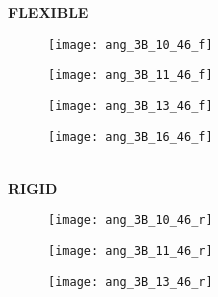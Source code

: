 \documentclass[12pt]{article}
\begin{document}
\begin{figure}[h!]
	\centering
	   \textbf{FLEXIBLE} \\
  \begin{subfigure}[b]{0.15\textwidth}
    \texttt{[image: ang\_3B\_10\_46\_f]}
    \vspace{-15pt} \caption{}
    \label{fig:ang_10_f}
  \end{subfigure}
  \begin{subfigure}[b]{0.15\textwidth}
    \texttt{[image: ang\_3B\_11\_46\_f]}
     \vspace{-15pt} \caption{}
    \label{fig:ang_11_f}
  \end{subfigure}
  \begin{subfigure}[b]{0.15\textwidth}
    \texttt{[image: ang\_3B\_13\_46\_f]}
    \vspace{-15pt} \caption{}
    \label{fig:ang_13_f}
  \end{subfigure}
  \begin{subfigure}[b]{0.15\textwidth}
    \texttt{[image: ang\_3B\_16\_46\_f]}
     \vspace{-15pt} \caption{}
    \label{fig:ang_16_f}
  \end{subfigure} \\     \vspace{-10pt} 
 \textbf{RIGID} \\
  \begin{subfigure}[b]{0.15\textwidth}
    \texttt{[image: ang\_3B\_10\_46\_r]}
     \vspace{-15pt} \caption{}
    \label{fig:ang_10_r}
  \end{subfigure}
  \begin{subfigure}[b]{0.15\textwidth}
    \texttt{[image: ang\_3B\_11\_46\_r]}
     \vspace{-15pt} \caption{}
    \label{fig:ang_11_r}
  \end{subfigure}
    \begin{subfigure}[b]{0.15\textwidth}
    \texttt{[image: ang\_3B\_13\_46\_r]}
     \vspace{-15pt} \caption{}
    \label{fig:ang_13_r}
  \end{subfigure}

\end{figure}
\end{document}
